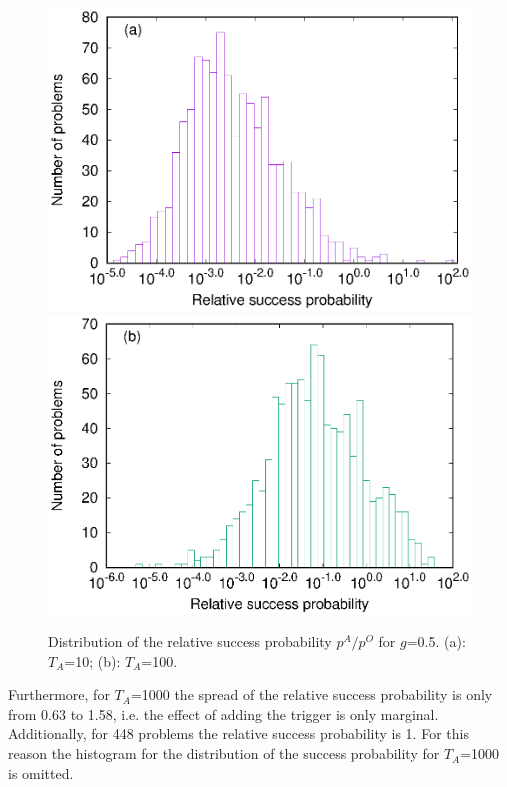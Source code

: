 \documentclass[../main.tex]{subfiles}
\begin{document}
\begin{figure}
\centering 
\includegraphics[scale=0.8 ]{A_T10_g2.eps}
\includegraphics[scale=0.8 ]{A_T100_g2.eps}
\caption{Distribution of the relative success probability $p^A/p^O$ for $g$=0.5. (a): $T_A$=10; (b): $T_A$=100.}
\label{fig:a37}
\end{figure}
Furthermore, for $T_A$=1000 the spread of the relative success probability is only from 0.63 to 1.58, i.e. the effect of adding the trigger is only marginal. Additionally, for 448 problems the relative success probability is 1. For this reason the histogram for the distribution of the success probability for $T_A$=1000 is omitted.
\end{document}
